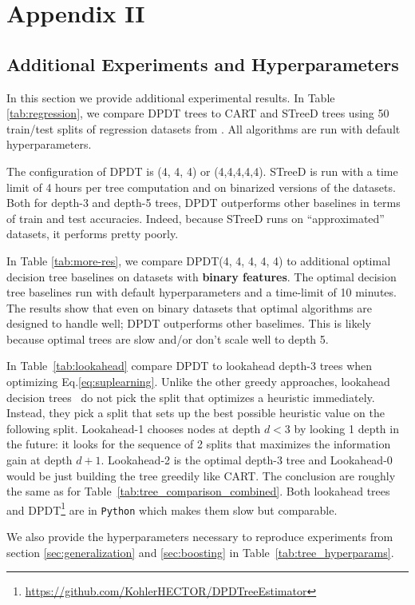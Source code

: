 \chapter{Appendix II}
\label{chap-app-dpdt}
\section{Additional Experiments and Hyperparameters}
In this section we provide additional experimental results. In Table \ref{tab:regression}, we compare DPDT trees to CART and STreeD trees using 50 train/test splits of regression datasets from \cite{grinsztajn2022tree}. All algorithms are run with default hyperparameters. 

The configuration of DPDT is (4, 4, 4) or (4,4,4,4,4). STreeD is run with a time limit of 4 hours per tree computation and on binarized versions of the datasets. 
Both for depth-3 and depth-5 trees, DPDT outperforms other baselines in terms of train and test accuracies. Indeed, because STreeD runs on ``approximated'' datasets, it performs pretty poorly. 

In Table \ref{tab:more-res}, we compare DPDT(4, 4, 4, 4, 4) to additional optimal decision tree baselines on datasets with \textbf{binary features}. The optimal decision tree baselines run with default hyperparameters and a time-limit of 10 minutes. The results show that even on binary datasets that optimal algorithms are designed to handle well; DPDT outperforms other baselimes. This is likely because optimal trees are slow and/or don't scale well to depth 5.

In Table~\ref{tab:lookahead} compare DPDT to lookahead depth-3 trees when optimizing Eq.\ref{eq:suplearning}. Unlike the other greedy approaches, lookahead decision trees~\cite{norton} do not pick the split that optimizes a heuristic immediately. Instead, they pick a split that sets up the best possible heuristic value on the following split. Lookahead-1 chooses nodes at depth $d<3$ by looking 1 depth in the future: it looks for the sequence of 2 splits that maximizes the information gain at depth $d + 1$. Lookahead-2 is the optimal depth-3 tree and Lookahead-0 would be just building the tree greedily like CART. The conclusion are roughly the same as for Table~\ref{tab:tree_comparison_combined}. Both lookahead trees and DPDT\footnote{\url{https://github.com/KohlerHECTOR/DPDTreeEstimator}} are in \texttt{Python} which makes them slow but comparable.

We also provide the hyperparameters necessary to reproduce experiments from section \ref{sec:generalization} and \ref{sec:boosting} in Table~\ref{tab:tree_hyperparams}.


